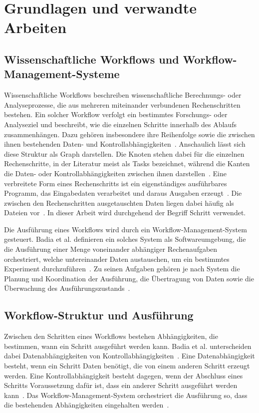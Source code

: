 
\chapter{Grundlagen und verwandte Arbeiten}
\label{sec:basics}



\section{Wissenschaftliche Workflows und Workflow-Management-Systeme}
\label{sec:basics:wms}
Wissenschaftliche Workflows beschreiben wissenschaftliche
Berechnungs- oder Analyseprozesse, die aus mehreren miteinander
verbundenen Rechenschritten bestehen. Ein solcher Workflow verfolgt
ein bestimmtes Forschungs- oder Analyseziel und beschreibt, wie die
einzelnen Schritte innerhalb des Ablaufs zusammenhängen. Dazu
gehören insbesondere ihre Reihenfolge sowie die zwischen ihnen
bestehenden Daten- und
Kontrollabhängigkeiten~\cite[S.~2]{suter2026terminology}.
Anschaulich lässt sich diese Struktur als Graph darstellen. Die
Knoten stehen dabei für die einzelnen Rechenschritte, in der
Literatur meist als Tasks bezeichnet, während die Kanten die Daten-
oder Kontrollabhängigkeiten zwischen ihnen
darstellen~\cite[S.~28\,f.]{badia2017workflows}. Eine verbreitete
Form eines Rechenschritts ist ein eigenständiges ausführbares
Programm, das Eingabedaten verarbeitet und daraus Ausgaben
erzeugt~\cite[S.~4]{suter2026terminology}. Die zwischen den
Rechenschritten ausgetauschten Daten liegen dabei häufig als Dateien
vor~\cite[S.~29]{badia2017workflows}. In dieser
Arbeit wird durchgehend der Begriff Schritt verwendet.
 
Die Ausführung eines Workflows wird durch ein
Workflow-Management-System gesteuert. Badia et al. definieren ein
solches System als Softwareumgebung, die die Ausführung einer Menge
voneinander abhängiger Rechenaufgaben orchestriert, welche
untereinander Daten austauschen, um ein bestimmtes Experiment
durchzuführen~\cite[S.~28]{badia2017workflows}.
Zu seinen Aufgaben gehören je nach System die Planung und
Koordination der Ausführung, die Übertragung von Daten sowie die
Überwachung des Ausführungszustands~\cite[S.~29]{badia2017workflows}\cite[S.~2]{suter2026terminology}.

\section{Workflow-Struktur und Ausführung}
\label{sec:basics:struktur}
Zwischen den Schritten eines Workflows bestehen Abhängigkeiten, die
bestimmen, wann ein Schritt ausgeführt werden kann. Badia et al.
unterscheiden dabei Datenabhängigkeiten von
Kontrollabhängigkeiten~\cite[S.~28]{badia2017workflows}. Eine
Datenabhängigkeit besteht, wenn ein Schritt Daten benötigt, die
von einem anderen Schritt erzeugt werden. Eine
Kontrollabhängigkeit besteht dagegen, wenn der Abschluss eines
Schritts Voraussetzung dafür ist, dass ein anderer Schritt
ausgeführt werden kann~\cite[S.~259]{zhou2008control}. Das
Workflow-Management-System orchestriert die Ausführung so, dass die
bestehenden Abhängigkeiten eingehalten
werden~\cite[S.~4]{suter2026terminology}.
 
